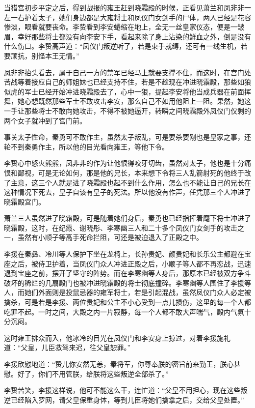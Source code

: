 当猎宫初步平定之后，得到战报的雍王赶到晓霜殿的时候，正看见萧兰和凤非非一左一右护着太子，她们身边都是大雍将士和凤仪门女剑手的尸体，两人已经是花容惨淡，眼看就要丧命。李贽看到李安蜷缩在地上，全无一丝皇家仪态，便是一皱眉，幸好那些将士都没有向李安下手，看起来除了身上沾染的鲜血之外，倒是没有什么伤口。李贽高声道：“凤仪门叛逆听了，若是束手就缚，还可有一线生机，若要顽抗，别怪本王无情。”

凤非非抬头看去，属于自己一方的禁军已经马上就要支撑不住，而这时，在宫门处苦战等着接应自己的师姐妹也已经支持不住，若是不趁现在冲进晓霜殿，那些如狼似虎的军士已经开始冲进晓霜殿去了，心中一狠，提起李安将他当成兵器在前面挥舞，她心想既然那些军士不敢攻击李安，那么自己不如用他阻上一阻。果然，她这一手让那些将士不敢向她攻击，不得不被她逼开，转瞬之间晓霜殿外凤仪门仅剩的两个女子就冲到了宫门前。

事关太子性命，秦勇可不敢作主，虽然太子叛乱，可是要杀要剐也是皇家之事，还轮不到秦勇作主，所以他的目光看向雍王，等他下令。

李贽心中怒火熊熊，凤非非的作为让他恨得咬牙切齿，虽然对太子，他也是十分痛恨和鄙视，可是无论如何，那是他的兄长，本来想下令将三人乱箭射死的他终于改了主意，这三个人就是进了晓霜殿也起不到什么作用，怎么也不能让自己的兄长在这种情况下死去，皇子自该有皇子的死法。所以他没有作声，任凭那三个人冲进了晓霜殿宫门。

萧兰三人虽然进了晓霜殿，可是随着她们身后，秦勇也已经指挥着麾下将士冲进了晓霜殿，这时，在纪霞、谢晓彤、李寒幽三人和二十多个凤仪门女剑手的攻击之一，虽然有小顺子等高手死命拦阻，可还是被迫退入了正殿之中。

李援在秦彝、冷川等人保护下坐在龙椅上，长孙贵妃、颜贵妃和长乐公主都避在宝座之后，被侍卫护着，当凤仪门众人冲进正殿之后，小顺子等人都不再恋战，迅速退到宝座之前，摆开了坚守的阵势。而在李寒幽等人身后，那原本已经被双方争斗破坏的稀烂的几扇殿门也被冲进晓霜殿的将士彻底撞碎。李寒幽等人围住了李援等人，而她们外面则是投鼠忌器的雍军将士，若是引起混战，虽然凤仪门众人必定被擒杀，可是若是李援、两位贵妃和公主不小心受到一点儿损伤，这里的每一个人都吃罪不起。一时之间，大殿之内一片寂静，每一个人都不敢大声喘气，殿内气氛十分沉闷。

这时雍王排众而入，他冰冷的目光在凤仪门和李安身上掠过，对着李援施礼道：“父皇，儿臣救驾来迟，往父皇恕罪。”

李援欣慰地道：“贽儿你安然无恙，秦将军，你尊奉朕的密旨前来勤王，朕心甚慰。好了，你们不用管朕，给朕将这些叛逆全部杀了。”

李贽苦笑，李援这样说，他可不能这么干，连忙道：“父皇不用担心，现在这些叛逆已经陷入罗网，请父皇保重身体，等到儿臣将她们擒拿之后，交给父皇处置。”

